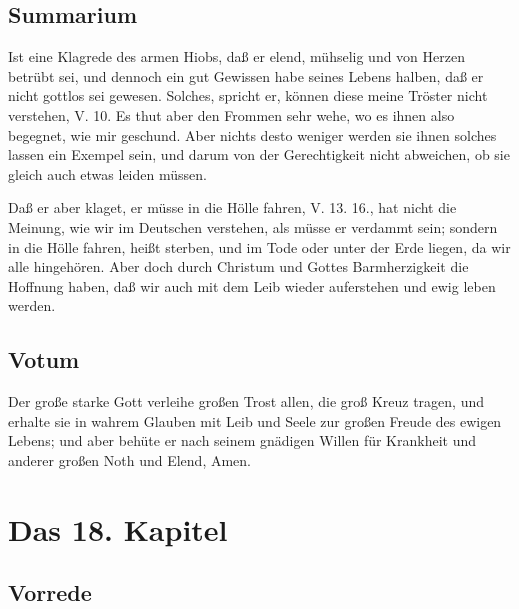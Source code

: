 \section{Summarium}

Ist eine Klagrede des armen Hiobs, daß er elend, mühselig und von Herzen betrübt sei, und dennoch ein gut Gewissen habe seines Lebens halben, daß er nicht gottlos sei gewesen. Solches, spricht er, können diese meine Tröster nicht verstehen, V. 10. Es thut aber den Frommen sehr wehe, wo es ihnen also begegnet, wie mir geschund. Aber nichts desto weniger werden sie ihnen solches lassen ein Exempel sein, und darum von der Gerechtigkeit nicht abweichen, ob sie gleich auch etwas leiden müssen.

Daß er aber klaget, er müsse in die Hölle fahren, V. 13. 16., hat nicht die Meinung, wie wir im Deutschen verstehen, als müsse er verdammt sein; sondern in die Hölle fahren, heißt sterben, und im Tode oder unter der Erde liegen, da wir alle hingehören. Aber doch durch Christum und Gottes Barmherzigkeit die Hoffnung haben, daß wir auch mit dem Leib wieder auferstehen und ewig leben werden.

\section{Votum}

Der große starke Gott verleihe großen Trost allen, die groß Kreuz tragen, und erhalte sie in wahrem Glauben mit Leib und Seele zur großen Freude des ewigen Lebens; und aber behüte er nach seinem gnädigen Willen für Krankheit und anderer großen Noth und Elend, Amen.

\chapter{Das 18. Kapitel}

\section{Vorrede}

